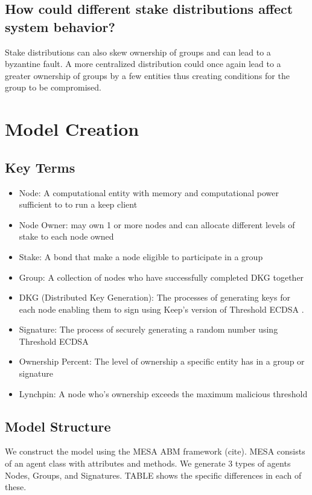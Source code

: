 \documentclass[conference]{IEEEtran}
\begin{document}
\subsection{How could different stake distributions affect system behavior?}
Stake distributions can also skew ownership of groups and can lead to a byzantine fault. A more
centralized distribution could once again lead to a greater ownership of groups by a few entities
thus creating conditions for the group to be compromised. 

\section{Model Creation}

\subsection{Key Terms}
\begin{itemize}
\item Node: A computational entity with memory and computational power sufficient to to run a 
keep client
    
\item Node Owner: may own 1 or more nodes and can allocate different levels of stake to each node
    owned
    
\item Stake: A bond that make a node eligible to participate in a group 
    
\item Group: A collection of nodes who have successfully completed DKG together
    
\item DKG (Distributed Key Generation): The processes of generating keys for each node enabling
    them to sign using Keep's version of Threshold ECDSA \cite{Gennaro2018}.
    
\item Signature: The process of securely generating a random number using Threshold ECDSA \cite{Gennaro2018}
    
\item Ownership Percent: The level of ownership a specific entity has in a group or signature
    
\item Lynchpin: A node who's ownership exceeds the maximum malicious threshold
\end{itemize}

\subsection{Model Structure}
We construct the model using the MESA ABM framework (cite). MESA consists of an agent class with
attributes and methods. We generate 3 types of agents Nodes, Groups, and Signatures. TABLE shows 
the specific differences in each of these.
\end{document}
